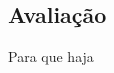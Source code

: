\documentclass[10pt, conference, compsocconf]{IEEEtran}
\begin{document}
\subsection{Avaliação}
Para que haja 








%
%
%
%

\end{document}

